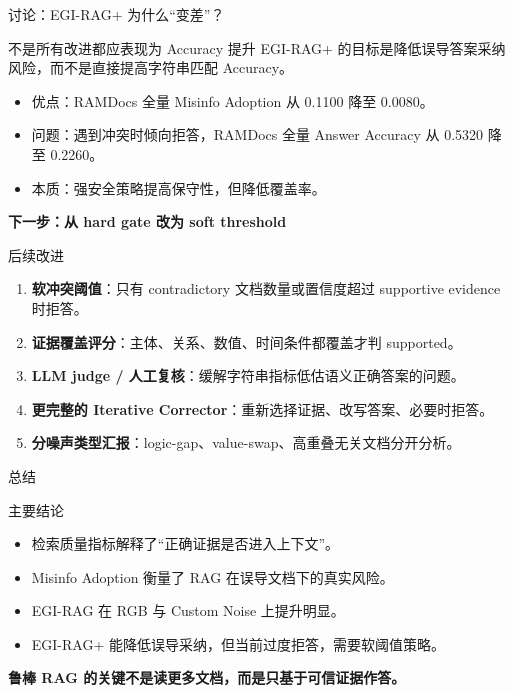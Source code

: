 \documentclass[aspectratio=169,10pt]{beamer}
\newcommand{\metric}[1]{\textcolor{MainBlue}{\textbf{#1}}}
\begin{document}
\begin{frame}{讨论：EGI-RAG+ 为什么“变差”？}
  \begin{alertblock}{不是所有改进都应表现为 Accuracy 提升}
    EGI-RAG+ 的目标是降低误导答案采纳风险，而不是直接提高字符串匹配 Accuracy。
  \end{alertblock}
  \begin{itemize}
    \item 优点：RAMDocs 全量 Misinfo Adoption 从 0.1100 降至 0.0080。
    \item 问题：遇到冲突时倾向拒答，RAMDocs 全量 Answer Accuracy 从 0.5320 降至 0.2260。
    \item 本质：强安全策略提高保守性，但降低覆盖率。
  \end{itemize}
  \vspace{0.2cm}
  \centering
  \Large \metric{下一步：从 hard gate 改为 soft threshold}
\end{frame}

\begin{frame}{后续改进}
  \begin{enumerate}
    \item \textbf{软冲突阈值}：只有 contradictory 文档数量或置信度超过 supportive evidence 时拒答。
    \item \textbf{证据覆盖评分}：主体、关系、数值、时间条件都覆盖才判 supported。
    \item \textbf{LLM judge / 人工复核}：缓解字符串指标低估语义正确答案的问题。
    \item \textbf{更完整的 Iterative Corrector}：重新选择证据、改写答案、必要时拒答。
    \item \textbf{分噪声类型汇报}：logic-gap、value-swap、高重叠无关文档分开分析。
  \end{enumerate}
\end{frame}

\begin{frame}{总结}
  \begin{block}{主要结论}
    \begin{itemize}
      \item 检索质量指标解释了“正确证据是否进入上下文”。
      \item Misinfo Adoption 衡量了 RAG 在误导文档下的真实风险。
      \item EGI-RAG 在 RGB 与 Custom Noise 上提升明显。
      \item EGI-RAG+ 能降低误导采纳，但当前过度拒答，需要软阈值策略。
    \end{itemize}
  \end{block}
  \vspace{0.3cm}
  \centering
  \Large \textbf{鲁棒 RAG 的关键不是读更多文档，而是只基于可信证据作答。}
\end{frame}
\end{document}
